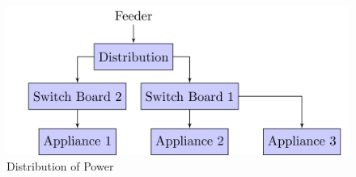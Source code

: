 \begin{figure} 
	\centering
	\includegraphics[width=1\linewidth]{tikz/distribution}
	\caption[Distribution of Power]{Distribution of Power}
	\label{fig:distribution}
\end{figure}
